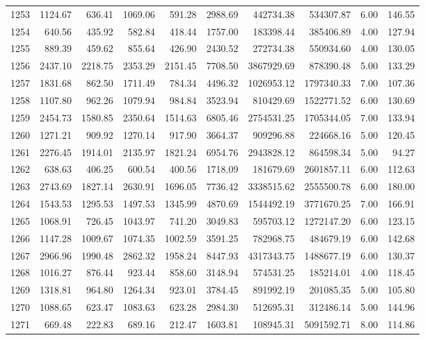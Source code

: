 \begin{tabular}{lrrrrrrrrr}
1253 & 1124.67 & 636.41 & 1069.06 & 591.28 & 2988.69 & 442734.38 & 534307.87 & 6.00 & 146.55 \\
1254 & 640.56 & 435.92 & 582.84 & 418.44 & 1757.00 & 183398.44 & 385406.89 & 4.00 & 127.94 \\
1255 & 889.39 & 459.62 & 855.64 & 426.90 & 2430.52 & 272734.38 & 550934.60 & 4.00 & 130.05 \\
1256 & 2437.10 & 2218.75 & 2353.29 & 2151.45 & 7708.50 & 3867929.69 & 878390.48 & 5.00 & 133.29 \\
1257 & 1831.68 & 862.50 & 1711.49 & 784.34 & 4496.32 & 1026953.12 & 1797340.33 & 7.00 & 107.36 \\
1258 & 1107.80 & 962.26 & 1079.94 & 984.84 & 3523.94 & 810429.69 & 1522771.52 & 6.00 & 130.69 \\
1259 & 2454.73 & 1580.85 & 2350.64 & 1514.63 & 6805.46 & 2754531.25 & 1705344.05 & 7.00 & 133.94 \\
1260 & 1271.21 & 909.92 & 1270.14 & 917.90 & 3664.37 & 909296.88 & 224668.16 & 5.00 & 120.45 \\
1261 & 2276.45 & 1914.01 & 2135.97 & 1821.24 & 6954.76 & 2943828.12 & 864598.34 & 5.00 & 94.27 \\
1262 & 638.63 & 406.25 & 600.54 & 400.56 & 1718.09 & 181679.69 & 2601857.11 & 6.00 & 112.63 \\
1263 & 2743.69 & 1827.14 & 2630.91 & 1696.05 & 7736.42 & 3338515.62 & 2555500.78 & 6.00 & 180.00 \\
1264 & 1543.53 & 1295.53 & 1497.53 & 1345.99 & 4870.69 & 1544492.19 & 3771670.25 & 7.00 & 166.91 \\
1265 & 1068.91 & 726.45 & 1043.97 & 741.20 & 3049.83 & 595703.12 & 1272147.20 & 6.00 & 123.15 \\
1266 & 1147.28 & 1009.67 & 1074.35 & 1002.59 & 3591.25 & 782968.75 & 484679.19 & 6.00 & 142.68 \\
1267 & 2966.96 & 1990.48 & 2862.32 & 1958.24 & 8447.93 & 4317343.75 & 1488677.19 & 6.00 & 130.37 \\
1268 & 1016.27 & 876.44 & 923.44 & 858.60 & 3148.94 & 574531.25 & 185214.01 & 4.00 & 118.45 \\
1269 & 1318.81 & 964.80 & 1264.34 & 923.01 & 3784.45 & 891992.19 & 201085.35 & 5.00 & 105.80 \\
1270 & 1088.65 & 623.47 & 1083.63 & 623.28 & 2984.30 & 512695.31 & 312486.14 & 5.00 & 144.96 \\
1271 & 669.48 & 222.83 & 689.16 & 212.47 & 1603.81 & 108945.31 & 5091592.71 & 8.00 & 114.86 \\

\end{tabular}
